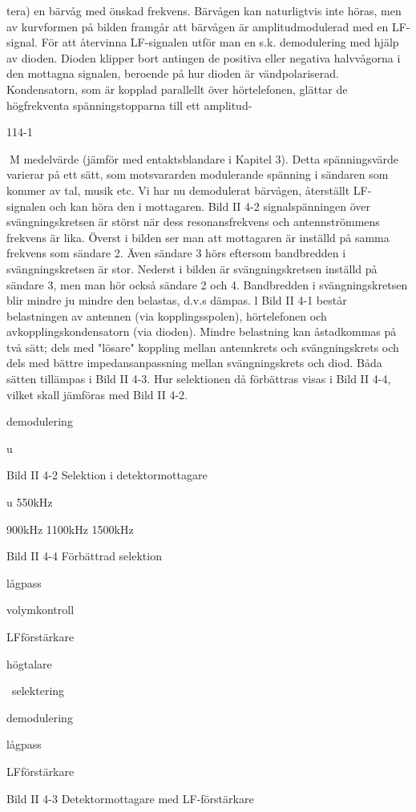 \documentclass[a4paper,twoside,twocolumn,openright]{book}
\begin{document}
{{{{tera) en bärvåg med önskad frekvens. Bärvågen kan naturligtvis inte höras, men av
kurvformen på bilden framgår att bärvågen
är amplitudmodulerad med en LF-signal.
För att återvinna LF-signalen utför man
en s.k. demodulering med hjälp av dioden.
Dioden klipper bort antingen de positiva
eller negativa halvvågorna i den mottagna
signalen, beroende på hur dioden är vändpolariserad. Kondensatorn, som är kopplad
parallellt över hörtelefonen, glättar de högfrekventa spänningstopparna till ett amplitud-

114-1

M
medelvärde (jämför med entaktsblandare i
Kapitel 3). Detta spänningsvärde varierar
på ett sätt, som motsvararden modulerande
spänning i sändaren som kommer av tal,
musik etc. Vi har nu demodulerat bärvågen,
återställt LF-signalen och kan höra den i
mottagaren.
Bild II 4-2
signalspänningen över svängningskretsen
är störst när dess resonansfrekvens och
antennströmmens frekvens är lika.
Överst i bilden ser man att mottagaren är
inställd på samma frekvens som sändare 2.
Även sändare 3 hörs eftersom bandbredden
i svängningskretsen är stor. Nederst i bilden
är svängningskretsen inställd på sändare 3,
men man hör också sändare 2 och 4.
Bandbredden i svängningskretsen blir
mindre ju mindre den belastas, d.v.s dämpas. l Bild II 4-1 består belastningen av
antennen (via kopplingsspolen), hörtelefonen och avkopplingskondensatorn (via dioden).
Mindre belastning kan åstadkommas på
två sätt; dels med "lösare" koppling mellan
antennkrets och svängningskrets och dels
med bättre impedansanpassning mellan
svängningskrets och diod. Båda sätten tillämpas i Bild II 4-3. Hur selektionen då
förbättras visas i Bild II 4-4, vilket skall
jämföras med Bild II 4-2.

demodulering

u

Bild II 4-2 Selektion i detektormottagare

u
550kHz

900kHz 1100kHz 1500kHz

Bild II 4-4 Förbättrad selektion

lågpass

volymkontroll

LFförstärkare

högtalare

}\
selektering

demodulering

lågpass

LFförstärkare

Bild II 4-3 Detektormottagare med LF-förstärkare

}}}
\end{document}
